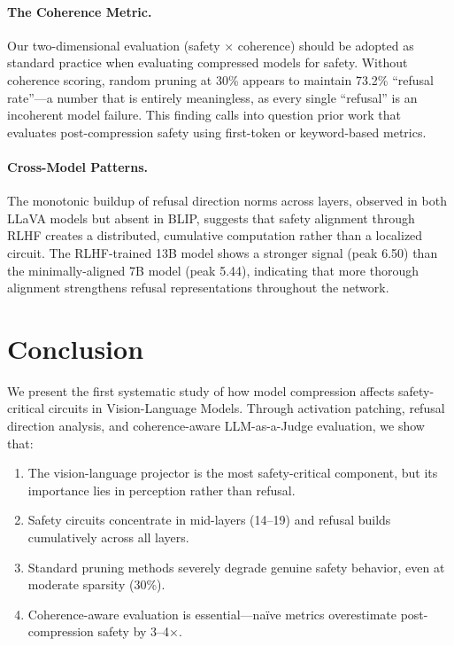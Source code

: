 \documentclass[11pt]{article}
\begin{document}
\paragraph{The Coherence Metric.}
Our two-dimensional evaluation (safety $\times$ coherence) should be adopted as standard practice when evaluating compressed models for safety. Without coherence scoring, random pruning at 30\% appears to maintain 73.2\% ``refusal rate''---a number that is entirely meaningless, as every single ``refusal'' is an incoherent model failure. This finding calls into question prior work that evaluates post-compression safety using first-token or keyword-based metrics.

\paragraph{Cross-Model Patterns.}
The monotonic buildup of refusal direction norms across layers, observed in both LLaVA models but absent in BLIP, suggests that safety alignment through RLHF creates a distributed, cumulative computation rather than a localized circuit. The RLHF-trained 13B model shows a stronger signal (peak 6.50) than the minimally-aligned 7B model (peak 5.44), indicating that more thorough alignment strengthens refusal representations throughout the network.

\section{Conclusion}

We present the first systematic study of how model compression affects safety-critical circuits in Vision-Language Models. Through activation patching, refusal direction analysis, and coherence-aware LLM-as-a-Judge evaluation, we show that:

\begin{enumerate}
    \item The vision-language projector is the most safety-critical component, but its importance lies in perception rather than refusal.
    \item Safety circuits concentrate in mid-layers (14--19) and refusal builds cumulatively across all layers.
    \item Standard pruning methods severely degrade genuine safety behavior, even at moderate sparsity (30\%).
    \item Coherence-aware evaluation is essential---na\"ive metrics overestimate post-compression safety by 3--4$\times$.
\end{enumerate}
\end{document}
